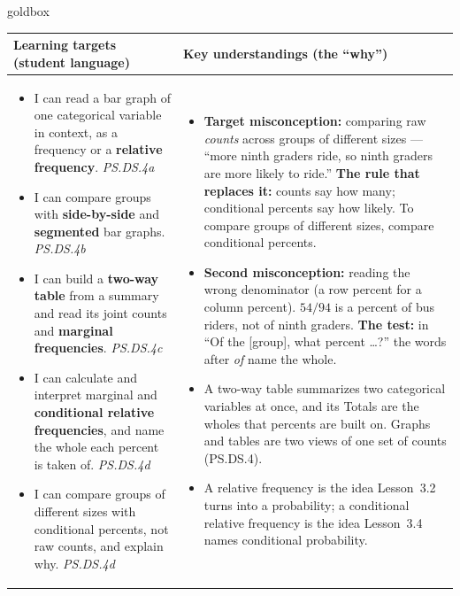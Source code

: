 \documentclass[10pt]{article}
\begin{document}
\renewcommand{\arraystretch}{1.4}
\boxguard
\begin{skillbox}{goldbox}
\begin{tabularx}{\linewidth}{@{}X|X@{}}
\textbf{Learning targets (student language)} & \textbf{Key understandings (the ``why'')} \\[2pt]
\hline
\vspace{-6pt}
\begin{itemize}[leftmargin=1.1em, nosep, after=\vspace{2pt}]
  \item I can read a bar graph of one categorical variable in context, as a frequency or a
        \textbf{relative frequency}. \hfill \textit{PS.DS.4a}
  \item I can compare groups with \textbf{side-by-side} and \textbf{segmented} bar graphs.
        \hfill \textit{PS.DS.4b}
  \item I can build a \textbf{two-way table} from a summary and read its joint counts and
        \textbf{marginal frequencies}. \hfill \textit{PS.DS.4c}
  \item I can calculate and interpret marginal and \textbf{conditional relative frequencies},
        and name the whole each percent is taken of. \hfill \textit{PS.DS.4d}
  \item I can compare groups of different sizes with conditional percents, not raw counts, and
        explain why. \hfill \textit{PS.DS.4d}
\end{itemize}
&
\vspace{-6pt}
\begin{itemize}[leftmargin=1.1em, nosep, after=\vspace{2pt}]
  \item \textbf{Target misconception:} comparing raw \emph{counts} across groups of different
        sizes --- ``more ninth graders ride, so ninth graders are more likely to ride.''
        \textbf{The rule that replaces it:} counts say how many; conditional percents say how
        likely. To compare groups of different sizes, compare conditional percents.
  \item \textbf{Second misconception:} reading the wrong denominator (a row percent for a column
        percent). $54/94$ is a percent of bus riders, not of ninth graders. \textbf{The test:} in
        ``Of the [group], what percent \ldots?'' the words after \emph{of} name the whole.
  \item A two-way table summarizes two categorical variables at once, and its Totals are the
        wholes that percents are built on. Graphs and tables are two views of one set of counts
        (PS.DS.4).
  \item A relative frequency is the idea Lesson~3.2 turns into a probability; a conditional
        relative frequency is the idea Lesson~3.4 names conditional probability.
\end{itemize}
\end{tabularx}
\end{skillbox}
\end{document}
